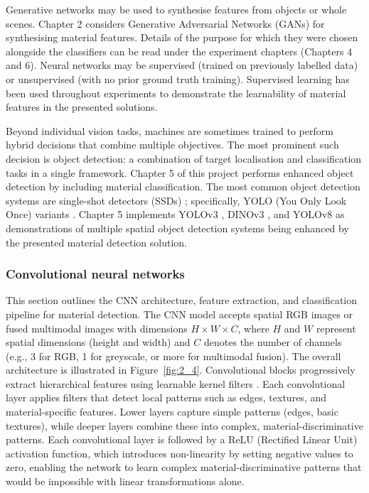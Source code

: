 \documentclass[12pt,a4paper,oneside]{report}
\begin{document}
Generative networks may be used to synthesise features from objects or whole scenes. Chapter 2 considers Generative Adversarial Networks (GANs) \cite{goodfellow2020} for synthesising material features. Details of the purpose for which they were chosen alongside the classifiers can be read under the experiment chapters (Chapters 4 and 6). Neural networks may be supervised (trained on previously labelled data) or unsupervised (with no prior ground truth training). Supervised learning has been used throughout experiments to demonstrate the learnability of material features in the presented solutions.

Beyond individual vision tasks, machines are sometimes trained to perform hybrid decisions that combine multiple objectives. The most prominent such decision is object detection: a combination of target localisation and classification tasks in a single framework. Chapter 5 of this project performs enhanced object detection by including material classification. The most common object detection systems are single-shot detectors (SSDs) \cite{liu2016}; specifically, YOLO (You Only Look Once) variants \cite{redmon2015,redmon2016,redmon2018}. Chapter 5 implements YOLOv3 \cite{redmon2018}, DINOv3 \cite{simeoni2025}, and YOLOv8 as demonstrations of multiple spatial object detection systems being enhanced by the presented material detection solution.

\subsubsection{Convolutional neural networks}
\label{subsubsec:convolutional_neural_networks}

This section outlines the CNN architecture, feature extraction, and classification pipeline for material detection. The CNN model accepts spatial RGB images or fused multimodal images with dimensions $H \times W \times C$, where $H$ and $W$ represent spatial dimensions (height and width) and $C$ denotes the number of channels (e.g., 3 for RGB, 1 for greyscale, or more for multimodal fusion). The overall architecture is illustrated in Figure~\ref{fig:2_4}.
Convolutional blocks progressively extract hierarchical features using learnable kernel filters \cite{lecun1998}. Each convolutional layer applies filters that detect local patterns such as edges, textures, and material-specific features. Lower layers capture simple patterns (edges, basic textures), while deeper layers combine these into complex, material-discriminative patterns. Each convolutional layer is followed by a ReLU (Rectified Linear Unit) activation function, which introduces non-linearity by setting negative values to zero, enabling the network to learn complex material-discriminative patterns that would be impossible with linear transformations alone.
\end{document}
